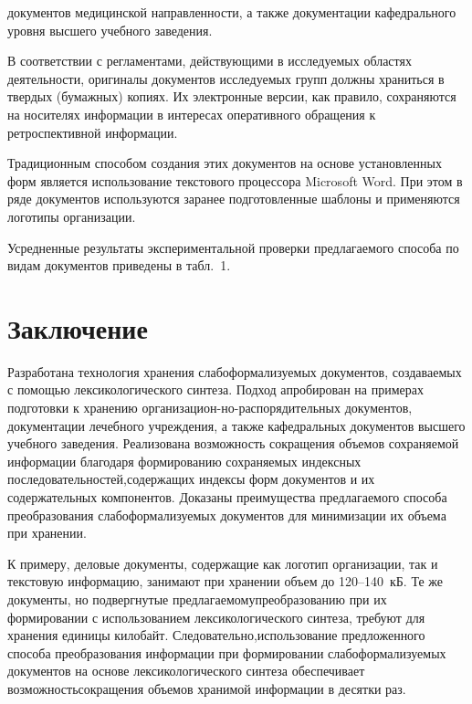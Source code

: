 \begin{multicols}{2}

\noindent
 документов медицинской 
направленности, а также документации кафедрального уровня высшего 
учебного заведения.
     
     В соответствии с регламентами, действующими в исследуемых областях 
деятельности, оригиналы документов исследуемых групп должны храниться в 
твердых (бумажных) копиях. Их электронные версии, как правило, 
сохраняются на носителях информации в интересах оперативного обращения к 
ретроспективной информации. 

Традиционным способом создания этих 
документов на основе установленных форм является использование текстового 
процессора Microsoft Word. При этом в ряде документов используются заранее 
подготовленные шаблоны и применяются логотипы организации.
{ %

}
     
     Усредненные результаты экспериментальной проверки предлагаемого 
способа по видам документов приведены в табл.~1.

     
\section{Заключение}
\vspace*{-4pt}

     
     Разработана технология хранения слабоформализуемых документов, 
создаваемых с помощью лексикологического синтеза. Подход апробирован на\linebreak 
примерах подготовки к хранению организацион-\linebreak но-распорядительных 
документов, документации\linebreak
лечебного учреждения, а также кафедральных\linebreak 
документов высшего учебного заведения. Реализована возможность 
сокращения объемов со\-хра\-ня\-емой информации благодаря формированию\linebreak 
со\-хра\-ня\-емых индексных последовательностей,\linebreak содержащих индексы форм 
документов и их содержательных компонентов. Доказаны преиму\-щества 
предлагаемого способа преобразования сла\-бо\-фор\-ма\-ли\-зу\-емых документов для 
минимизации их \mbox{объема} при хранении. 

К примеру, деловые документы, 
содержащие как логотип организации, так и текстовую информацию, занимают 
при хранении объем до 120--140~кБ. Те же документы, но подвергнутые 
предлагаемому\linebreak преобразованию при их формировании с использованием 
лексикологического синтеза, требуют для хранения единицы килобайт. 
Следовательно,\linebreak использование предложенного способа преобра\-зования 
информации при формировании сла\-бо\-формализуемых документов на основе 
лексикологического синтеза обеспечивает возможность\linebreak сокращения объемов 
хранимой информации в десятки раз. 


\end{multicols}
